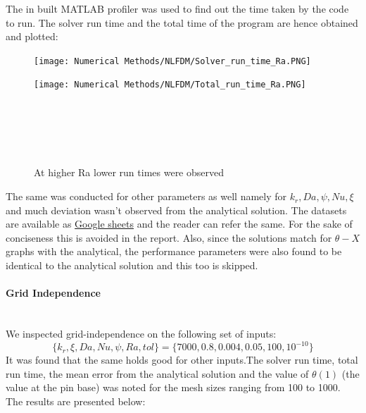 \documentclass[12pt]{article}
\newcommand{\subsubsubsection}[1]{\paragraph{#1}\mbox{}\\}
\begin{document}
The in built MATLAB profiler was used to find out the time taken by the code to run. The solver run time and the total time of the program are hence obtained and plotted: 

\begin{figure}[H]
\begin{minipage}{.5\textwidth}
    \hspace{-0.4cm}
    \vspace{-1.4cm}
  \texttt{[image: Numerical Methods/NLFDM/Solver\_run\_time\_Ra.PNG]}
  \label{fig:16}
\end{minipage}%
\begin{minipage}{.5\textwidth}
  \hspace{-0.5cm}
  \vspace{-1.4cm}
  \texttt{[image: Numerical Methods/NLFDM/Total\_run\_time\_Ra.PNG]}
  \label{fig:17}
\end{minipage}
\\ \\ \\ \\
\caption{At higher Ra lower run times were observed}
\end{figure}

The same was conducted for other parameters as well namely for $k_r,Da,\psi,Nu,\xi$ and much deviation wasn't observed from the analytical solution. The datasets are available as \href{https://docs.google.com/spreadsheets/d/14CD9h_oIQvpSYWhHdYkxh0rk-RfhSL3lAaR-XjAy2KA/edit?usp=sharing}{Google sheets} and the reader can refer the same. For the sake of conciseness this is avoided in the report. Also, since the solutions match for $\theta-X$ graphs with the analytical, the performance parameters were also found to be identical to the analytical solution and this too is skipped.
\subsubsubsection{Grid Independence}
We inspected grid-independence on the following set of inputs: 
\[
\{k_r,\xi, Da, Nu, \psi, Ra, tol\} = \{7000,0.8,0.004,0.05,100,10^{-10}\}
\]
It was found that the same holds good for other inputs.The solver run time, total run time, the mean error from the analytical solution and the value of $\theta(1)$ (the value at the pin base) was noted for the mesh sizes ranging from 100 to 1000. The results are presented below: 
\end{document}
